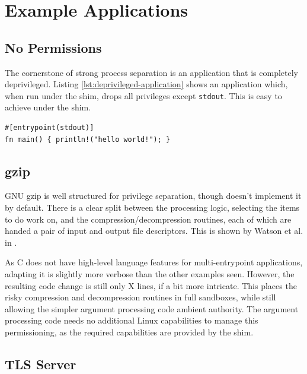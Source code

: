 \documentclass[sigplan]{acmart}
\begin{document}
\section{Example Applications}

\subsection{No Permissions}

The cornerstone of strong process separation is an application that is completely deprivileged. Listing \ref{lst:deprivileged-application} shows an application which, when run under the shim, drops all privileges except \texttt{stdout}. This is easy to achieve under the shim.

\begin{lstlisting}[float,label={lst:deprivileged-application}]
#[entrypoint(stdout)]
fn main() { println!("hello world!"); }
\end{lstlisting}

\subsection{gzip}

GNU gzip \citep{gailly_gzip_2020} is well structured for privilege separation, though doesn't implement it by default. There is a clear split between the processing logic, selecting the items to do work on, and the compression/decompression routines, each of which are handed a pair of input and output file descriptors. This is shown by Watson et al. in \cite{watson_capsicum_2010}.

As C does not have high-level language features for multi-entrypoint applications, adapting it is slightly more verbose than the other examples seen. However, the resulting code change is still only X lines, if a bit more intricate. This places the risky compression and decompression routines in full sandboxes, while still allowing the simpler argument processing code ambient authority. The argument processing code needs no additional Linux capabilities to manage this permissioning, as the required capabilities are provided by the shim.

\subsection{TLS Server}
\end{document}

